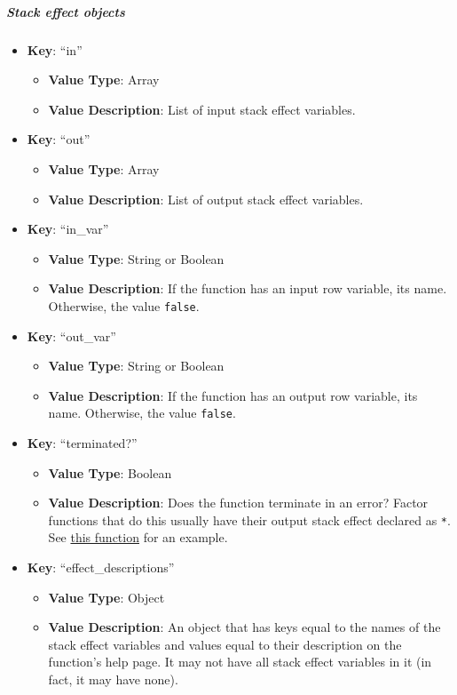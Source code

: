 \documentclass[
]{article}
\begin{document}
\hypertarget{stack-effect-objects}{%
\subparagraph{Stack effect objects}\label{stack-effect-objects}}

\begin{itemize}
  \item \textbf{Key}: ``in''
    \begin{itemize}
      \item \textbf{Value Type}:
        Array
      \item \textbf{Value Description}: 
      List of input stack effect variables.
    \end{itemize}
  \item \textbf{Key}: ``out''
    \begin{itemize}
      \item \textbf{Value Type}:
        Array
      \item \textbf{Value Description}: 
      List of output stack effect variables.
    \end{itemize}
  \item \textbf{Key}: ``in\_var''
    \begin{itemize}
      \item \textbf{Value Type}:
        String or Boolean
      \item \textbf{Value Description}: 
      If the function has an input row variable, its name. Otherwise, the
      value \texttt{false}.
    \end{itemize}
  \item \textbf{Key}: ``out\_var''
    \begin{itemize}
      \item \textbf{Value Type}:
        String or Boolean
      \item \textbf{Value Description}: 
      If the function has an output row variable, its name. Otherwise, the
      value \texttt{false}.
    \end{itemize}
  \item \textbf{Key}: ``terminated?''
    \begin{itemize}
      \item \textbf{Value Type}:
        Boolean
      \item \textbf{Value Description}: 
      Does the function terminate in an error? Factor functions that do this
      usually have their output stack effect declared as \texttt{*}. See
      \href{https://docs.factorcode.org/content/word-decode-error\%2Cio.encodings.html}{this
      function} for an example.
    \end{itemize}
  \item \textbf{Key}: ``effect\_descriptions''
    \begin{itemize}
      \item \textbf{Value Type}:
        Object
      \item \textbf{Value Description}: 
      An object that has keys equal to the names of the stack effect variables
      and values equal to their description on the function's help page. It
      may not have all stack effect variables in it (in fact, it may have
      none).
    \end{itemize}
\end{itemize}
\end{document}
